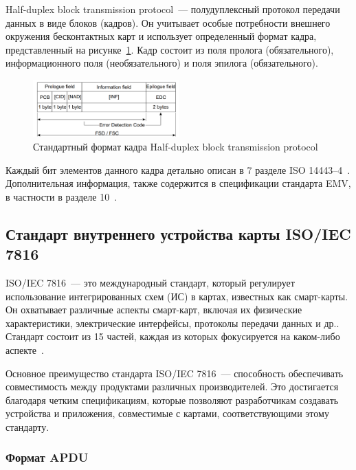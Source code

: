 Half-duplex block transmission protocol~--- полудуплексный протокол передачи данных в виде блоков (кадров).
Он учитывает особые потребности внешнего окружения бесконтактных карт и использует определенный формат кадра, представленный на рисунке~\ref{fig:hd_block_format}.
Кадр состоит из поля пролога (обязательного), информационного поля (необязательного) и поля эпилога (обязательного).

\begin{figure}[H]
    \centering
    \includegraphics[width=0.5\textwidth]{images/research/hd_block_format}
    \caption{\centering Стандартный формат кадра Half-duplex block transmission protocol}
    \label{fig:hd_block_format}
\end{figure}

Каждый бит элементов данного кадра детально описан в 7 разделе ISO 14443--4~\cite{iso14443-4}.
Дополнительная информация, также содержится в спецификации стандарта EMV, в частности в разделе 10~\cite{emv_specifications_book}.


\subsection{Стандарт внутреннего устройства карты ISO/IEC 7816}
\label{subsec:7816}

ISO/IEC 7816~--- это международный стандарт, который регулирует использование интегрированных схем (ИС) в картах, известных как смарт-карты.
Он охватывает различные аспекты смарт-карт, включая их физические характеристики, электрические интерфейсы, протоколы передачи данных и др..
Стандарт состоит из 15 частей, каждая из которых фокусируется на каком-либо аспекте~\cite{7816_wiki}.

Основное преимущество стандарта ISO/IEC 7816~--- способность обеспечивать совместимость между продуктами различных производителей.
Это достигается благодаря четким спецификациям, которые позволяют разработчикам создавать устройства и приложения, совместимые с картами, соответствующими этому стандарту.

\subsubsection{Формат APDU}

